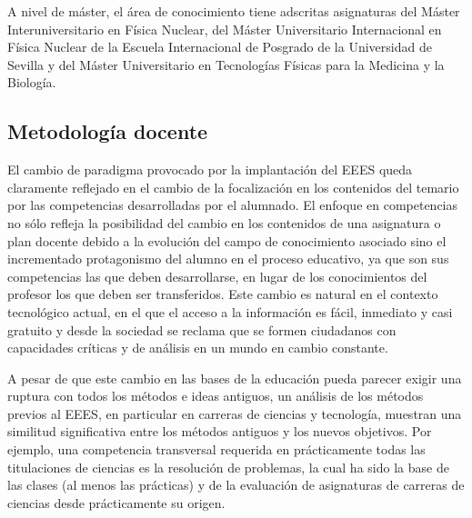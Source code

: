 \documentclass[a4paper,12pt,twoside]{article}
\begin{document}
A nivel de máster, el área de conocimiento tiene adscritas asignaturas del Máster Interuniversitario en Física Nuclear, del Máster Universitario Internacional en Física Nuclear de la Escuela Internacional de Posgrado de la Universidad de Sevilla y del Máster Universitario en Tecnologías Físicas para la Medicina y la Biología.

\subsection{Metodología docente}

El cambio de paradigma provocado por la implantación del EEES queda claramente reflejado en el cambio de la focalización en los contenidos del temario por las competencias desarrolladas por el alumnado. El enfoque en competencias no sólo refleja la posibilidad del cambio en los contenidos de una asignatura o plan docente debido a la evolución del campo de conocimiento asociado sino el incrementado protagonismo del alumno en el proceso educativo, ya que son sus competencias las que deben desarrollarse, en lugar de los conocimientos del profesor los que deben ser transferidos. Este cambio es natural en el contexto tecnológico actual, en el que el acceso a la información es fácil, inmediato y casi gratuito y desde la sociedad se reclama que se formen ciudadanos con capacidades críticas y de análisis en un mundo en cambio constante.

A pesar de que este cambio en las bases de la educación pueda parecer exigir una ruptura con todos los métodos e ideas antiguos, un análisis de los métodos previos al EEES, en particular en carreras de ciencias y tecnología, muestran una similitud significativa entre los métodos antiguos y los nuevos objetivos. Por ejemplo, una competencia transversal requerida en prácticamente todas las titulaciones de ciencias es la resolución de problemas, la cual ha sido la base de las clases (al menos las prácticas) y de la evaluación de asignaturas de carreras de ciencias desde prácticamente su origen. 
\end{document}
